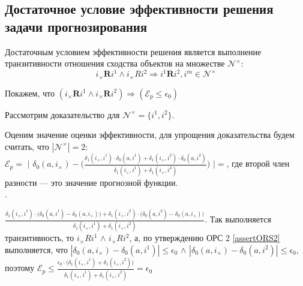 \subsection{Достаточное условие эффективности решения задачи прогнозирования}
\begin{assert}
  Достаточным условием эффективности решения является выполнение 
	транзитивности отношения сходства объектов на множестве $\mathcal{N}^{\times}$:
\begin{equation}\label{suff-cond-pred-ors}
i_{\times} \mathbf{R} i^1 \wedge i_{\times} \mathit{R} i^2  \Rightarrow i^1 \mathbf{R} i^2, i^m \in \mathcal{N}^{\times}
\end{equation}
\end{assert}

Покажем, что $(i_{\times} \mathbf{R} i^1 \wedge i_{\times} \mathbf{R} i^2) \Rightarrow (\mathcal{E}_{p} \le \epsilon_0)$

\begin{myproof}
Рассмотрим доказательство для $\mathcal{N}^{\times} = \{i^1,i^2\}$. 
\end{myproof}


Оценим значение оценки эффективности, для упрощения доказательства будем считать, что $|\mathcal{N}^{\times}| = 2$:\\
$\mathcal{E}_{p} = $ $\Bigg|$ $\delta_0(a, i_{\times}) - 
\Big( \frac{\delta_1(i_{\times}, i^1) \cdot \delta_0(a, i^1) + \delta_1(i_{\times}, i^2) \cdot \delta_0(a, i^2)}
{\delta_1(i_{\times}, i^1) + \delta_1(i_{\times}, i^2)} \Big)$ $\Bigg| = $, где второй член разности --- это значение 
прогнозной функции. \\ .




$\frac{\delta_1(i_{\times}, i^1) \cdot \Big( \delta_0(a, i^1) - \delta_0(a, i_{\times})\Big) + 
\delta_1(i_{\times}, i^2) \cdot \Big( \delta_0(a, i^2) - \delta_0(a, i_{\times})\Big)}
{\delta_1(i_{\times}, i^1) + \delta_1(i_{\times}, i^2)}$. Так выполняется транзитивность, то
$i_{\times} \mathit{R} i^1$ $\wedge$ $i_{\times} \mathit{R} i^2$, а, по утверждению ОРС 2 \ref{assertORS2} выполняется, 
что $|\delta_0(a,i_{\times}) - \delta_0(a,i^1)| \le \epsilon_0$ $\wedge$ $|\delta_0(a,i_{\times}) - \delta_0(a,i^2)| \le \epsilon_0$, 
поэтому $\mathcal{E}_{p} \le \frac{\epsilon_0 \cdot \Big( \delta_1(i_{\times}, i^1) + \delta_1(i_{\times}, i^2) \Big)}{\delta_1(i_{\times}, i^1) + \delta_1(i_{\times}, i^2)} = \epsilon_0$



